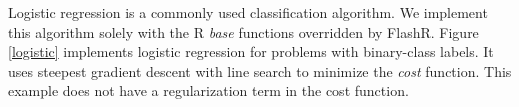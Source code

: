 Logistic regression is a commonly used classification algorithm.
We implement this algorithm solely with the R \textit{base} functions
overridden by FlashR. Figure
\ref{logistic} implements logistic regression for problems with binary-class
labels. It uses steepest gradient descent with line search to minimize
the \textit{cost} function. This example does not have a regularization term
in the cost function.

